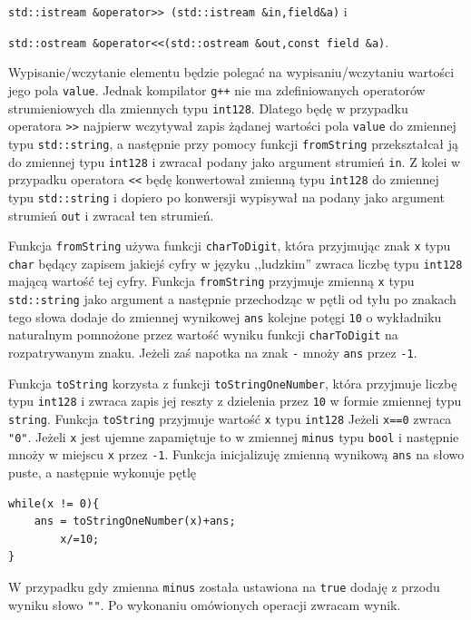 \documentclass{article}
\begin{document}
\texttt{std::istream \&operator>> (std::istream \&in,field\&a)} i

\texttt{std::ostream \&operator<<(std::ostream \&out,const field \&a)}.

Wypisanie/wczytanie elementu będzie polegać na wypisaniu/wczytaniu 
wartości jego pola \texttt{value}. Jednak kompilator \texttt{g++} nie ma zdefiniowanych operatorów strumieniowych 
dla zmiennych typu \texttt{\textunderscore \textunderscore int128}. Dlatego będę w przypadku operatora \texttt{>>} najpierw
wczytywał zapis żądanej wartości pola \texttt{value} do zmiennej typu \texttt{std::string}, a następnie przy pomocy funkcji 
\texttt{fromString} przekształcał ją do zmiennej typu \texttt{\textunderscore \textunderscore int128} i zwracał podany 
jako argument strumień \texttt{in}. Z kolei w przypadku operatora \texttt{<<} będę konwertował zmienną typu 
\texttt{\textunderscore \textunderscore int128} do zmiennej typu \texttt{std::string} i dopiero po konwersji
wypisywał na podany jako argument strumień \texttt{out} i zwracał ten strumień.

Funkcja \texttt{fromString} używa funkcji \texttt{charToDigit}, która przyjmując znak \texttt{x} typu 
\texttt{char} będący zapisem jakiejś cyfry w języku ,,ludzkim'' zwraca liczbę typu 
\texttt{\textunderscore \textunderscore int128} mającą wartość tej cyfry. Funkcja \texttt{fromString} przyjmuje 
zmienną \texttt{x} typu \texttt{std::string} jako argument a następnie przechodząc w pętli od tyłu
po znakach tego słowa
dodaje do zmiennej wynikowej \texttt{ans} kolejne potęgi \texttt{10} o wykładniku naturalnym pomnożone przez wartość
wyniku funkcji \texttt{charToDigit} na rozpatrywanym znaku. Jeżeli zaś napotka na znak \texttt{-} mnoży \texttt{ans}
przez \texttt{-1}.

Funkcja \texttt{toString} korzysta z funkcji \texttt{toStringOneNumber}, która przyjmuje liczbę typu \texttt{\textunderscore \textunderscore int128}
i zwraca zapis jej reszty z dzielenia przez \texttt{10} w formie zmiennej typu \texttt{string}.
Funkcja \texttt{toString} 
przyjmuje wartość \texttt{x} typu \texttt{\textunderscore \textunderscore int128}
Jeżeli \texttt{x==0} zwraca \texttt{"0"}. Jeżeli \texttt{x} jest ujemne zapamiętuje to w zmiennej
\texttt{minus} typu \texttt{bool} i następnie mnoży w miejscu \texttt{x} przez \texttt{-1}. 
Funkcja inicjalizuję zmienną wynikową \texttt{ans} na słowo puste, a następnie wykonuje pętlę
\begin{verbatim}
while(x != 0){
    ans = toStringOneNumber(x)+ans;
	    x/=10;
}
\end{verbatim}
W przypadku gdy zmienna \texttt{minus} została ustawiona na \texttt{true} dodaję z przodu wyniku słowo \texttt{"\textminus"}.
Po wykonaniu omówionych operacji zwracam wynik. 
\end{document}
